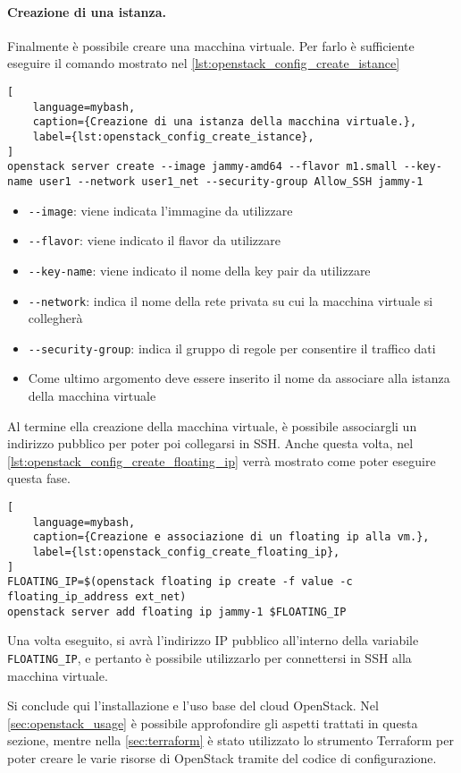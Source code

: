 \paragraph{Creazione di una istanza.}
Finalmente è possibile creare una macchina virtuale.
% 
Per farlo è sufficiente eseguire il comando mostrato nel \cref{lst:openstack_config_create_istance}
\begin{lstlisting}[
    language=mybash, 
    caption={Creazione di una istanza della macchina virtuale.},
    label={lst:openstack_config_create_istance},
]
openstack server create --image jammy-amd64 --flavor m1.small --key-name user1 --network user1_net --security-group Allow_SSH jammy-1
\end{lstlisting}
\begin{itemize}
    \item \verb|--image|: viene indicata l'immagine da utilizzare
    
    \item \verb|--flavor|: viene indicato il flavor da utilizzare

    \item \verb|--key-name|: viene indicato il nome della key pair da utilizzare
        
    \item \verb|--network|: indica il nome della rete privata su cui la macchina virtuale si collegherà  
        
    \item \verb|--security-group|: indica il gruppo di regole per consentire il traffico dati
        
    \item Come ultimo argomento deve essere inserito il nome da associare alla istanza della macchina virtuale
\end{itemize}

\noindent
Al termine ella creazione della macchina virtuale, è possibile associargli un indirizzo pubblico per poter poi collegarsi in SSH.
% 
Anche questa volta, nel \cref{lst:openstack_config_create_floating_ip} verrà mostrato come poter eseguire questa fase.
\begin{lstlisting}[
    language=mybash, 
    caption={Creazione e associazione di un floating ip alla vm.},
    label={lst:openstack_config_create_floating_ip},
]
FLOATING_IP=$(openstack floating ip create -f value -c floating_ip_address ext_net)
openstack server add floating ip jammy-1 $FLOATING_IP
\end{lstlisting}

\noindent
Una volta eseguito, si avrà l'indirizzo IP pubblico all'interno della variabile \texttt{FLOATING\_IP}, e pertanto è possibile utilizzarlo per connettersi in SSH alla macchina virtuale.

\bigskip
\noindent
Si conclude qui l'installazione e l'uso base del cloud OpenStack.
% 
Nel \cref{sec:openstack_usage} è possibile approfondire gli aspetti trattati in questa sezione, mentre nella \cref{sec:terraform} è stato utilizzato lo strumento Terraform per poter creare le varie risorse di OpenStack tramite del codice di configurazione.